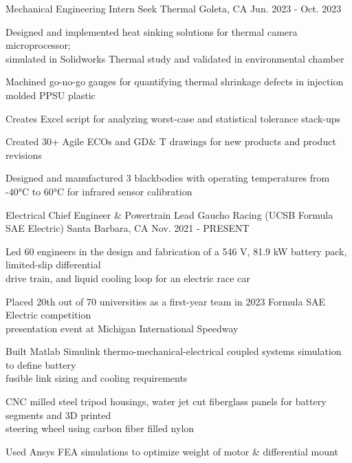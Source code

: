 

\begin{cventries}

\cventry
{Mechanical Engineering Intern} %
{Seek Thermal} %
{Goleta, CA} %
{Jun. 2023 - Oct. 2023} %
{ %
\begin{cvitems}
\item{Designed and implemented heat sinking solutions for thermal camera microprocessor; \\ simulated in Solidworks Thermal study and validated in environmental chamber}
\item{Machined go-no-go gauges for quantifying thermal shrinkage defects in injection molded PPSU plastic}
\item{Creates Excel script for analyzing worst-case and statistical tolerance stack-ups}
\item{Created 30+ Agile ECOs and GD\& T drawings for new products and product revisions}
\item{Designed and manufactured 3 blackbodies with operating temperatures from -40°C to 60°C for infrared sensor calibration}
\end{cvitems}
}

\cventry
{Electrical Chief Engineer \& Powertrain Lead} %
{Gaucho Racing (UCSB Formula SAE Electric)} %
{Santa Barbara, CA} %
{Nov. 2021 - PRESENT} %
{ %
\begin{cvitems}   
\item {Led 60 engineers in the design and fabrication of a 546 V, 81.9 kW battery pack, limited-slip differential \\ drive train, and liquid cooling loop for an electric race car}
\item {Placed 20th out of 70 universities as a first-year team in 2023 Formula SAE Electric competition\\ presentation event at Michigan International Speedway}
\item {Built Matlab Simulink thermo-mechanical-electrical coupled systems simulation to define battery \\ fusible link sizing and cooling requirements}
\item {CNC milled steel tripod housings, water jet cut fiberglass panels for battery segments and 3D printed \\ steering wheel using carbon fiber filled nylon}
\item {Used Ansys FEA simulations to optimize weight of motor \&  differential mount}
\end{cvitems}
}



\end{cventries}
